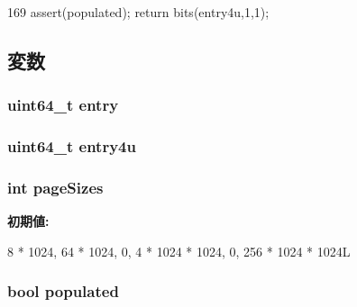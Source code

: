 \begin{DoxyCode}
169 { assert(populated); return bits(entry4u,1,1); }
\end{DoxyCode}


\subsection{変数}
\hypertarget{classSparcISA_1_1PageTableEntry_a6aac0a1a7d70f8270f9bb1222445f370}{
\subsubsection[{entry}]{\setlength{\rightskip}{0pt plus 5cm}uint64\_\-t {\bf entry}}}
\label{classSparcISA_1_1PageTableEntry_a6aac0a1a7d70f8270f9bb1222445f370}
\hypertarget{classSparcISA_1_1PageTableEntry_a85106b3232fe527ff60e876a9b79009e}{
\subsubsection[{entry4u}]{\setlength{\rightskip}{0pt plus 5cm}uint64\_\-t {\bf entry4u}}}
\label{classSparcISA_1_1PageTableEntry_a85106b3232fe527ff60e876a9b79009e}
\hypertarget{classSparcISA_1_1PageTableEntry_a3a85d8c453cc213556f3308e8dbdd6af}{
\subsubsection[{pageSizes}]{\setlength{\rightskip}{0pt plus 5cm}int {\bf pageSizes}}}
\label{classSparcISA_1_1PageTableEntry_a3a85d8c453cc213556f3308e8dbdd6af}
{\bfseries 初期値:}
\begin{DoxyCode}

    { 8 * 1024, 64 * 1024, 0, 4 * 1024 * 1024, 0, 256 * 1024 * 1024L}
\end{DoxyCode}
\hypertarget{classSparcISA_1_1PageTableEntry_a09092dab7a486a492b9b5fd4adee5c48}{
\subsubsection[{populated}]{\setlength{\rightskip}{0pt plus 5cm}bool {\bf populated}}}
